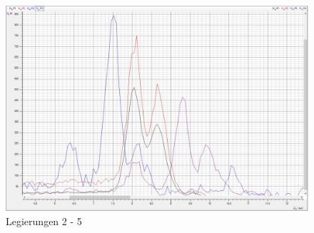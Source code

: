 \begin{figure}[H]
  \centering
  \includegraphics[width=\textwidth]{files/legierung2345.jpg}
  \caption{Legierungen 2 - 5}
  \label{fig:legierung2345_zsmf}
\end{figure}
